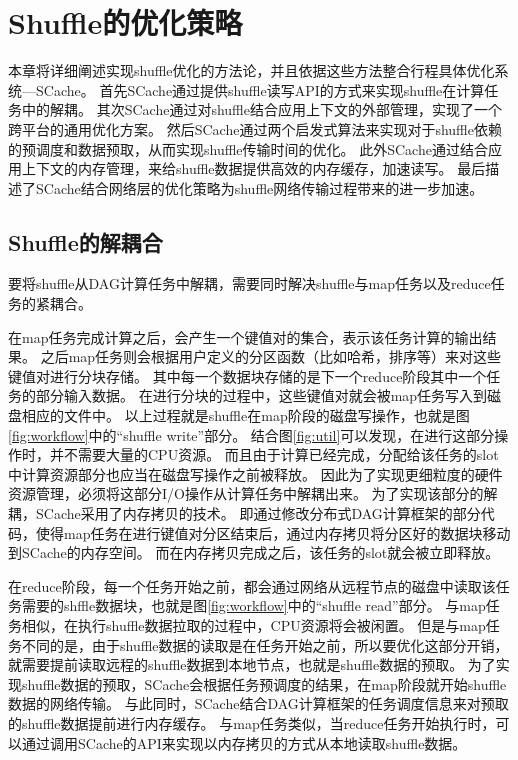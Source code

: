 
\chapter{Shuffle的优化策略}
\label{chap:optimization}

本章将详细阐述实现shuffle优化的方法论，并且依据这些方法整合行程具体优化系统---SCache。
首先SCache通过提供shuffle读写API的方式来实现shuffle在计算任务中的解耦。
其次SCache通过对shuffle结合应用上下文的外部管理，实现了一个跨平台的通用优化方案。
然后SCache通过两个启发式算法来实现对于shuffle依赖的预调度和数据预取，从而实现shuffle传输时间的优化。
此外SCache通过结合应用上下文的内存管理，来给shuffle数据提供高效的内存缓存，加速读写。
最后描述了SCache结合网络层的优化策略为shuffle网络传输过程带来的进一步加速。

\section{Shuffle的解耦合}

要将shuffle从DAG计算任务中解耦，需要同时解决shuffle与map任务以及reduce任务的紧耦合。

在map任务完成计算之后，会产生一个键值对的集合，表示该任务计算的输出结果。
之后map任务则会根据用户定义的分区函数（比如哈希，排序等）来对这些键值对进行分块存储。
其中每一个数据块存储的是下一个reduce阶段其中一个任务的部分输入数据。
在进行分块的过程中，这些键值对就会被map任务写入到磁盘相应的文件中。
以上过程就是shuffle在map阶段的磁盘写操作，也就是图\ref{fig:workflow}中的“shuffle write”部分。
结合图\ref{fig:util}可以发现，在进行这部分操作时，并不需要大量的CPU资源。
而且由于计算已经完成，分配给该任务的slot中计算资源部分也应当在磁盘写操作之前被释放。
因此为了实现更细粒度的硬件资源管理，必须将这部分I/O操作从计算任务中解耦出来。
为了实现该部分的解耦，SCache采用了内存拷贝的技术。
即通过修改分布式DAG计算框架的部分代码，使得map任务在进行键值对分区结束后，通过内存拷贝将分区好的数据块移动到SCache的内存空间。
而在内存拷贝完成之后，该任务的slot就会被立即释放。

在reduce阶段，每一个任务开始之前，都会通过网络从远程节点的磁盘中读取该任务需要的shffle数据块，也就是图\ref{fig:workflow}中的“shuffle read”部分。
与map任务相似，在执行shuffle数据拉取的过程中，CPU资源将会被闲置。
但是与map任务不同的是，由于shuffle数据的读取是在任务开始之前，所以要优化这部分开销，就需要提前读取远程的shuffle数据到本地节点，也就是shuffle数据的预取。
为了实现shuffle数据的预取，SCache会根据任务预调度的结果，在map阶段就开始shuffle数据的网络传输。
与此同时，SCache结合DAG计算框架的任务调度信息来对预取的shuffle数据提前进行内存缓存。
与map任务类似，当reduce任务开始执行时，可以通过调用SCache的API来实现以内存拷贝的方式从本地读取shuffle数据。

